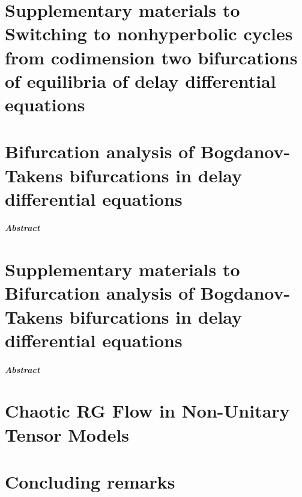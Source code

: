 \documentclass[twoside]{report}
\begin{document}
\chapter[Supplementary materials]
        {Supplementary materials to 
         Switching to nonhyperbolic cycles from codimension two bifurcations of equilibria of delay differential equations}
\label{chapter:switching_supplement}
\renewcommand\datadir{data/switching}


\renewcommand\tikzdir{./tikz/btpaper}
\renewcommand\imagedir{./images/btpaper/}
\renewcommand\datadir{./data/btpaper}
\chapter[Bifurcation analysis of BT points in DDEs]
        {Bifurcation analysis of Bogdanov-Takens bifurcations in delay differential equations}
\label{chapter:BT_DDE}
\paragraph{{\color{header1}Abstract}}


\chapter[Supplementary materials]
        {Supplementary materials to Bifurcation analysis of Bogdanov-Takens bifurcations in delay differential equations}
\label{chapter:BT_DDE_supplement}
\paragraph{{\color{header1}Abstract}}


\renewcommand\tikzdir{./tikz/chaoticRGflow}
\renewcommand\imagedir{./images/chaoticRGflow/}
\renewcommand\datadir{./data/chaoticRGflow}
\chapter{Chaotic RG Flow in Non-Unitary Tensor Models}
\label{chapter:chaoticRGFlow}


\chapter{Concluding remarks}




\end{document}
